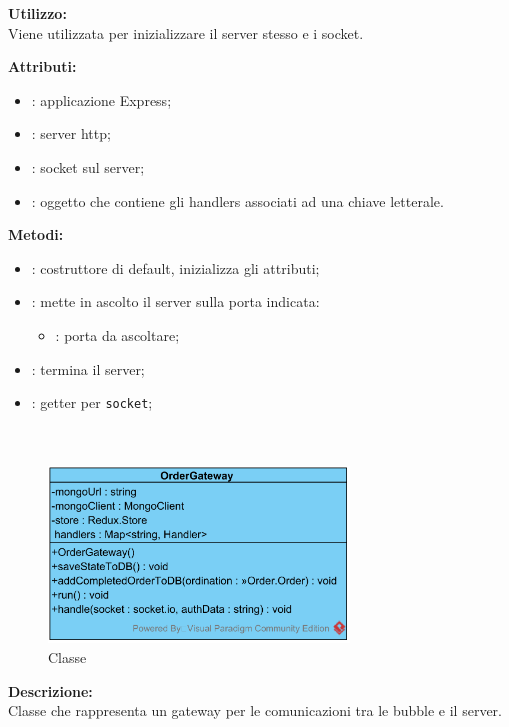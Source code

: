 \textbf{Utilizzo:}\\
Viene utilizzata per inizializzare il server stesso e i socket.

%

\textbf{Attributi:}
\begin{itemize}
	\item {}: applicazione Express;
	\item {}: server http;
	\item {}: socket sul server;
	\item {}: oggetto che contiene gli handlers associati ad una chiave letterale.
\end{itemize}

\textbf{Metodi:}
\begin{itemize}
	\item {}: costruttore di default, inizializza gli attributi;
	\item {}: mette in ascolto il server sulla porta indicata:
	\begin{itemize}
		\item {}: porta da ascoltare;
	\end{itemize}
	\item {}: termina il server;
	\item {}: getter per \texttt{socket};
\end{itemize}

\paragraph[::OrderGateway]{\class}\mbox{}\\ \label{\class}
\begin{figure}[H]
	\centering
	\includegraphics[width=8cm]{./diagrammi/demo/server/ordergateway.png}
	\caption{Classe \class}
\end{figure}
\textbf{Descrizione:}\\
Classe che rappresenta un gateway per le comunicazioni tra le bubble e il server.

